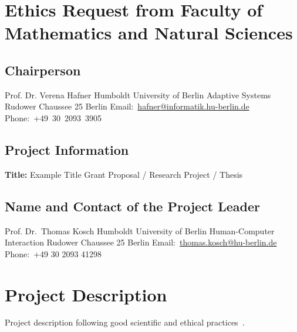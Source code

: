 \documentclass[letterpaper]{article}
\title{}
\author{Thomas Kosch}
\date{2023-06-22}
\newcommand\textstyleHyperlink[1]{\textcolor[rgb]{0.019607844,0.3882353,0.75686276}{#1}}
\begin{document}
\clearpage\clearpage\pagestyle{MP}
\section{Ethics Request from Faculty of Mathematics and Natural Sciences}

\bigskip

\subsection{Chairperson}
Prof. Dr. Verena Hafner\newline
Humboldt University of Berlin\newline
Adaptive Systems\newline
Rudower Chaussee 25 Berlin\newline
Email:\ \href{mailto:hafner@informatik.hu-berlin.de}{\textstyleHyperlink{hafner@informatik.hu-berlin.de}}\newline
Phone:\ +49\ 30\ 2093\ 3905


\bigskip

\subsection{Project Information}
{\bfseries Title:} Example Title \newline
{} Grant Proposal / Research Project / Thesis

\subsection{Name and Contact of the Project Leader}
Prof. Dr.\ Thomas Kosch\newline
Humboldt University of Berlin\newline
Human-Computer Interaction\newline
Rudower Chaussee 25 Berlin\newline
Email:\ \href{mailto:thomas.kosch@hu-berlin.de}{\textstyleHyperlink{thomas.kosch@hu-berlin.de}}\ \newline
\textcolor[rgb]{0.2,0.2,0.2}{Phone:\ }+49 30 2093 41298

\clearpage

\section{Project Description}
Project description following good scientific and ethical practices~\cite{greene2019better}.
\end{document}
